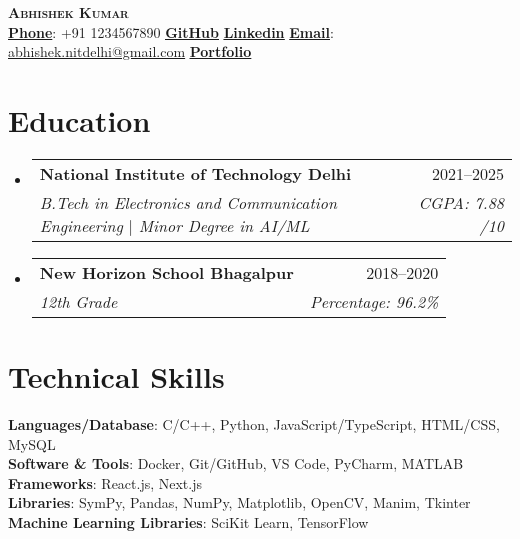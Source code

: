 \documentclass[a4paper, 10.75pt]{article}
\makeatletter
\newcommand{\resumeSubheading}[4]{
  \vspace{-2pt}\item
    \begin{tabular*}{0.97\textwidth}[t]{l@{\extracolsep{\fill}}r}
      \textbf{#1} & #2 \\
      \textit{\small#3} & \textit{\small #4} \\
    \end{tabular*}\vspace{-8pt}
}
\newcommand{\resumeSubHeadingListStart}{\begin{itemize}[leftmargin=0.15in, label={}]}
\newcommand{\resumeSubHeadingListEnd}{\end{itemize}}
\makeatother
\begin{document}
\begin{center}
    \textbf{\Huge \scshape Abhishek Kumar} \\ \vspace{8pt}
    \small 
    \textbf{\underline{Phone}}: {+91 1234567890} \hspace{12pt} %
    \href{https://github.com/abhiphile}{\textbf{\underline{GitHub}}} \hspace{12pt} %
    \href{https://www.linkedin.com/in/abhishek-kumar-nitdelhi/}{\textbf{\underline{Linkedin}}} \hspace{12pt} %
    \textbf{\underline{Email}}: 
    \href{mailto:abhishek.nitdelhi@gmail.com}
    {\underline{abhishek.nitdelhi@gmail.com}} \hspace{12pt} 
    \href{https://abhishek-portfolio-chi.vercel.app/}{{\textbf{\underline{Portfolio}}}}
\end{center}


\section{Education}
\resumeSubHeadingListStart

\resumeSubheading
{National Institute of Technology Delhi}{2021--2025}
{B.Tech in Electronics and Communication Engineering
$|$ Minor Degree in AI/ML}{CGPA: 7.88 /10}

\resumeSubheading
{New Horizon School Bhagalpur}{2018--2020}
{12th Grade}{Percentage: 96.2\%}

\resumeSubHeadingListEnd


\section{Technical Skills}
 \begin{itemize}[leftmargin=0.15in, label={}]
    \small{\item{
    
     \textbf{Languages/Database}{: C/C++, Python, JavaScript/TypeScript, HTML/CSS, MySQL} \\
     \textbf{Software \& Tools}{: Docker, Git/GitHub, VS Code, PyCharm, MATLAB}\\
      \textbf{Frameworks}{: React.js, Next.js} \\
      \textbf{Libraries}{: SymPy, Pandas, NumPy, Matplotlib, OpenCV, Manim, Tkinter }\\
     \textbf{Machine Learning Libraries}{: SciKit Learn, TensorFlow}
    }}
 \end{itemize}
\end{document}
